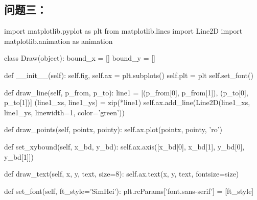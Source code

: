 \documentclass{ctexart}
\begin{document}
\subsection*{问题三：}
\begin{python}
import matplotlib.pyplot as plt
from matplotlib.lines import Line2D
import matplotlib.animation as animation

class Draw(object):
    bound_x = []
    bound_y = []

    def __init__(self):
        self.fig, self.ax = plt.subplots()
        self.plt = plt
        self.set_font()

    def draw_line(self, p_from, p_to):
        line1 = [(p_from[0], p_from[1]), (p_to[0], p_to[1])]
        (line1_xs, line1_ys) = zip(*line1)
        self.ax.add_line(Line2D(line1_xs, line1_ys, linewidth=1, color='green'))

    def draw_points(self, pointx, pointy):
        self.ax.plot(pointx, pointy, 'ro')

    def set_xybound(self, x_bd, y_bd):
        self.ax.axis([x_bd[0], x_bd[1], y_bd[0], y_bd[1]])

    def draw_text(self, x, y, text, size=8):
        self.ax.text(x, y, text, fontsize=size)

    def set_font(self, ft_style='SimHei'):
        plt.rcParams['font.sans-serif'] = [ft_style]
\end{python}
\end{document}
